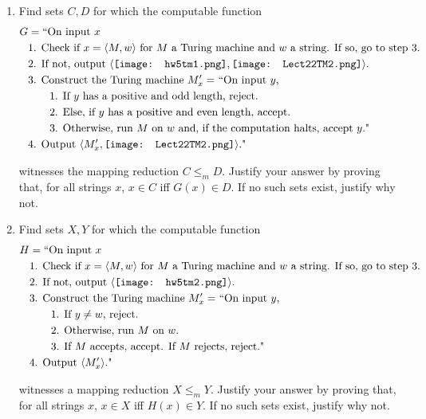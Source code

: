 \documentclass[12pt, oneside]{article}
\begin{document}
\begin{enumerate}
\begin{enumerate}
    \vfill
    
    \item Find sets $C, D$ for which  the computable function
    \begin{align*}
    G &= \text{``On input $x$} \\
    &\text{1. Check if $x = \langle M, w \rangle$ for $M$ a Turing machine and $w$ a string. If so, go to  step 3.}\\
    &\text{2. If not, output  $\langle \texttt{[image: hw5tm1.png]},   \texttt{[image: Lect22TM2.png]} \rangle$.}\\
    &\text{3. Construct the Turing machine $M'_x = $ ``On input $y$,} \\
    &\text{\qquad 1. If $y$ has a positive and odd length, reject.}\\
    &\text{\qquad 2. Else, if $y$ has a positive and even length, accept.}\\
    &\text{\qquad 3. Otherwise, run $M$ on $w$ and, if the computation halts, accept $y$."}\\
    &\text{4. Output  $\langle M'_x , \texttt{[image: Lect22TM2.png]}\rangle$."}
    \end{align*}
    
    \vspace{-10pt}
    
    witnesses the mapping reduction $C  \leq_m D$.
    Justify your  answer by  proving that, for all  strings $x$, $x \in C $ iff  $G(x) \in D$.
    If no such sets exist, justify why not.

    
    \vfill
    
    \item Find sets $X, Y$ for which  the computable function
    \begin{align*}
    H &= \text{``On input $x$} \\
    &\text{1. Check if $x = \langle M, w \rangle$ for $M$ a Turing machine and $w$ a string. If so, go to  step 3.}\\
    &\text{2. If not, output  $\langle \texttt{[image: hw5tm2.png]}\rangle$.}\\
    &\text{3. Construct the Turing machine $M'_x = $ ``On input $y$,} \\
    &\text{\qquad 1. If $y \neq w$, reject.}\\
    &\text{\qquad 2. Otherwise, run $M$ on $w$.}\\
    &\text{\qquad 3. If $M$  accepts,  accept.  If  $M$ rejects, reject."} \\
    &\text{4. Output  $\langle M'_x \rangle$."}
    \end{align*}
    
    \vspace{-10pt}
    
    witnesses a mapping reduction $X \leq_m Y$. 
    Justify your  answer by  proving that, for all  strings $x$, $x \in X $ iff  $H(x) \in Y$.
    If no such sets exist, justify why not.
    
    \end{enumerate}
\end{enumerate}
\end{document}
